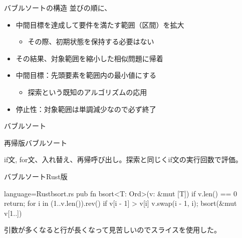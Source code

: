 \documentclass{beamer}
\begin{document}
\begin{frame}[fragile]{バブルソートの構造}{}
並びの順に、
\begin{itemize}%
\item 中間目標を達成して要件を満たす範囲（区間）を拡大
\begin{itemize}%
\item その際、初期状態を保持する必要はない
\end{itemize}
\item その結果、対象範囲を縮小した相似問題に帰着
\end{itemize}

\vfill
\begin{itemize}%
\item 中間目標：先頭要素を範囲内の最小値にする
\begin{itemize}%
\item 探索という既知のアルゴリズムの応用
\end{itemize}

\item 停止性：対象範囲は単調減少なので必ず終了
\end{itemize}
\end{frame}

\begin{frame}[fragile]{バブルソート}{}

\begin{algorithm}[H]
\BlankLine
{}
\caption[page]{再帰版バブルソート}
\end{algorithm}
\vfill
if文, for文、入れ替え、再帰呼び出し。探索と同じくif文の実行回数で評価。
\end{frame}

\begin{frame}[fragile]{バブルソートRust版}{\href{https://replit.com/@shnarazk/Sortings-in-Rust}{}}
\begin{codeof}{language=Rust}{bsort.rs}
pub fn bsort<T: Ord>(v: &mut [T]) {
    if v.len() == 0 { return; }
    for i in (1..v.len()).rev() {
        if v[i - 1] > v[i] {
            v.swap(i - 1, i);
        }
    }
    bsort(&mut v[1..])
}
\end{codeof}

引数が多くなると行が長くなって見苦しいのでスライスを使用した。

\end{frame}
\end{document}
